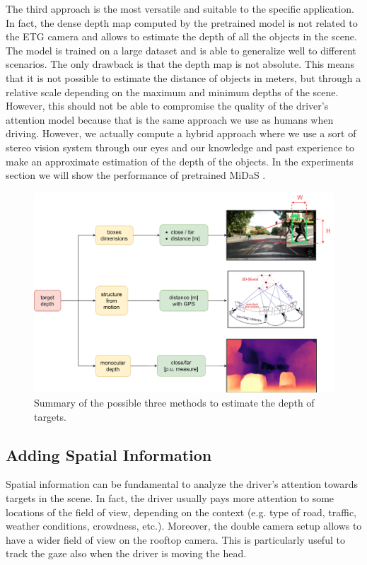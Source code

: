 The third approach is the most versatile and suitable to the specific application.
In fact, the dense depth map computed by the pretrained model is not related to the 
ETG camera and allows to estimate the depth of all the objects in the scene.
The model is trained on a large dataset and is able to generalize well to 
different scenarios. The only drawback is that the depth map is not absolute. 
This means that it is not possible to estimate the distance of objects in meters, 
but through a relative scale depending on the maximum and minimum depths of the 
scene. However, this should not be able to compromise the quality of the 
driver's attention model because that is the same approach we use as humans 
when driving. However, we actually compute a hybrid approach where we use a sort 
of stereo vision system through our eyes and our knowledge and past experience 
to make an approximate estimation of the depth of the objects.
In the experiments section we will show the performance of pretrained MiDaS 
\cite{midas}.

\begin{figure}
\centering
\includegraphics[width=\textwidth]{images/dreyeve/depth_estimation.png}
\caption[Three possible methods to estimate targets' depth]
{Summary of the possible three methods to estimate the depth of targets.}
\label{fig:depth_estimation}
\end{figure}



\subsection{Adding Spatial Information}
Spatial information can be fundamental to analyze the driver's attention 
towards targets in the scene. In fact, the driver usually pays more attention 
to some locations of the field of view, depending on the context (e.g. type of 
road, traffic, weather conditions, crowdness, etc.).
Moreover, the double camera setup allows to have a wider field of view on the 
rooftop camera. This is particularly useful to track the gaze also when the 
driver is moving the head. 

